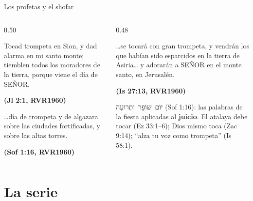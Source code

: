 \documentclass[hyperref={bookmarks=false},aspectratio=169]{beamer}
\newcommand{\heb}[1]{\mbox{\foreignlanguage{hebrew}{#1}}}
\newcommand{\SENOR}{S{\fontsize{0.78em}{1em}\selectfont EÑOR}}
\newcommand{\fuente}[1]{\par\hfill{\upshape\bfseries\footnotesize\textcolor{tierraroja}{#1}}}
\newcommand{\destacar}[1]{\textbf{\textcolor{tierraroja}{#1}}}
\begin{document}
\begin{frame}{Los profetas y el shofar}
\begin{columns}[t,onlytextwidth]
\begin{column}{0.50\textwidth}
\begin{cita}Tocad trompeta en Sion, y dad alarma en mi santo monte; tiemblen todos los moradores de la tierra, porque viene el día de \SENOR.\fuente{(Jl 2:1, RVR1960)}\end{cita}
\begin{cita}\ldots{}día de trompeta y de algazara sobre las ciudades fortificadas, y sobre las altas torres.\fuente{(Sof 1:16, RVR1960)}\end{cita}
\end{column}
\begin{column}{0.48\textwidth}
\begin{cita}\ldots{}se tocará con gran trompeta, y vendrán los que habían sido esparcidos en la tierra de Asiria\ldots{} y adorarán a \SENOR{} en el monte santo, en Jerusalén.\fuente{(Is 27:13, RVR1960)}\end{cita}
\scriptsize\RaggedRight \heb{יוֹם שׁוֹפָר וּתְרוּעָה} (Sof 1:16): las palabras de la fiesta aplicadas al \destacar{juicio}. El atalaya debe tocar (Ez 33:1--6); Dios mismo toca (Zac 9:14); ``alza tu voz como trompeta'' (Is 58:1).
\end{column}
\end{columns}
\end{frame}

\section{La serie}
\end{document}

